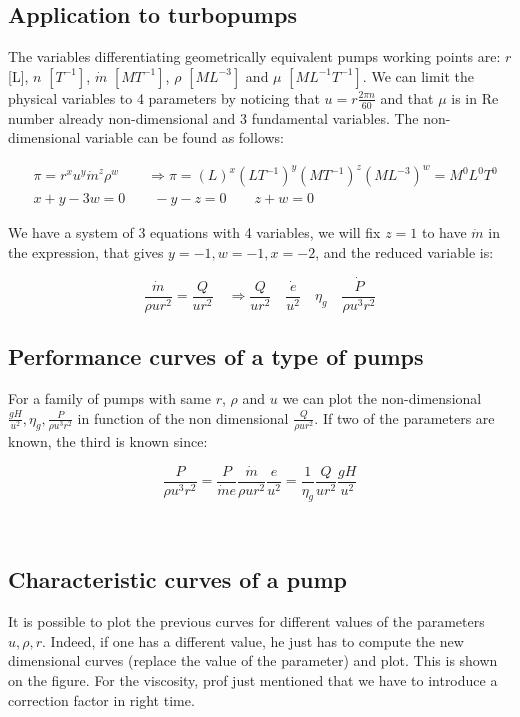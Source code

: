 \subsection{Application to turbopumps}
The variables differentiating geometrically equivalent pumps working points are: $r$ [L], $n$ $[T^{-1}]$, $\dot{m}$ $[MT^{-1}]$, $\rho$ $[ML^{-3}]$ and $\mu$ $[ML^{-1}T^{-1}]$. We can limit the physical variables to 4 parameters by noticing that $u = r \frac{2\pi n}{60}$ and that $\mu$ is in Re number already non-dimensional and 3 fundamental variables. The non-dimensional variable can be found as follows: 

\begin{equation}
\begin{aligned}
&\pi = r^xu^y\dot{m}^z\rho^w \qquad \Rightarrow \pi = (L)^x(LT^{-1})^y(MT^{-1})^z(ML^{-3})^w = M^0L^0T^0\\
&x+y-3w = 0 \qquad -y-z = 0\qquad z+w = 0
\end{aligned}
\end{equation}

We have a system of 3 equations with 4 variables, we will fix $z=1$ to have $\dot{m}$ in the expression, that gives $y = -1, w = -1, x=-2$, and the reduced variable is: 

\begin{equation}
\frac{\dot{m}}{\rho u r^2} = \frac{Q}{ur^2} \quad \Rightarrow \frac{Q}{u r^2} \quad \frac{\dot{e}}{u^2} \quad \eta _g \quad \frac{\dot{P}}{\rho u^3 r^2}
\end{equation}

\subsection{Performance curves of a type of pumps}
For a family of pumps with same $r$, $\rho$ and $u$ we can plot the non-dimensional $\frac{gH}{u^2}, \eta _g, \frac{P}{\rho u^3 r^2}$ in function of the non dimensional $\frac{Q}{\rho u r^2}$. If two of the parameters are known, the third is known since: 

\begin{equation}
\frac{P}{\rho u^3 r^2} = \frac{P}{\dot{m}e}\frac{\dot{m}}{\rho u r^2} \frac{e}{u^2} = \frac{1}{\eta _g}\frac{Q}{ur^2}\frac{gH}{u^2}
\end{equation}

\ \\
\subsection{Characteristic curves of a pump}
It is possible to plot the previous curves for different values of the parameters $u, \rho, r$. Indeed, if one has a different value, he just has to compute the new dimensional curves (replace the value of the parameter) and plot. This is shown on the figure.  For the viscosity, prof just mentioned that we have to introduce a correction factor in right time. 

